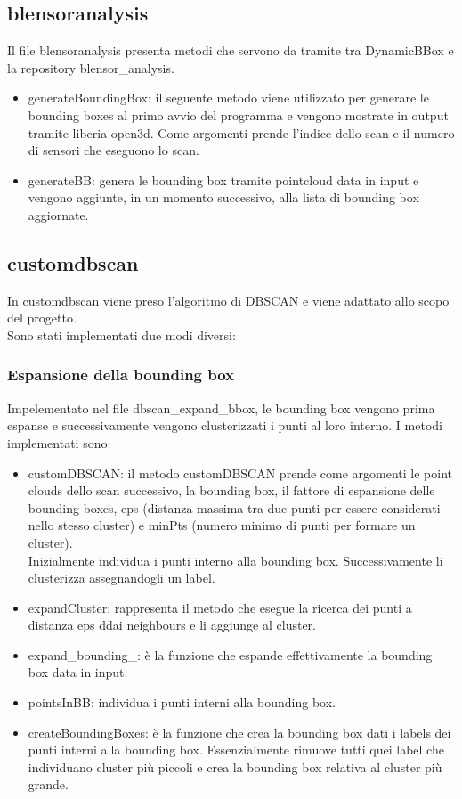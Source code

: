 \documentclass[italian]{article}
\begin{document}
\subsection{blensoranalysis}
Il file blensoranalysis presenta metodi che servono da tramite tra DynamicBBox e la repository blensor\_analysis.
\begin{itemize}
		\item generateBoundingBox: il seguente metodo viene utilizzato per generare le bounding boxes al primo avvio del programma e vengono mostrate in output tramite liberia open3d. Come argomenti prende
			l'indice dello scan e il numero di sensori che eseguono lo scan. 
 		\item generateBB: genera le bounding box tramite pointcloud data in input e vengono aggiunte, in un momento successivo, alla lista di bounding box aggiornate.
\end{itemize}
\subsection{customdbscan}
In customdbscan viene preso l'algoritmo di DBSCAN e viene adattato allo scopo del progetto.\\
Sono stati implementati due modi diversi:
\subsubsection{Espansione della bounding box}
Impelementato nel file dbscan\_expand\_bbox, le bounding box vengono prima espanse e successivamente vengono clusterizzati i punti al loro interno.
I metodi implementati sono:
\begin{itemize}
	\item customDBSCAN: il metodo customDBSCAN prende come argomenti le point clouds dello scan successivo, la bounding box, il fattore di espansione delle bounding boxes, eps (distanza massima tra due punti per essere considerati nello stesso cluster) e minPts (numero minimo di punti per formare un cluster).\\ Inizialmente individua i punti interno alla bounding box. Successivamente li clusterizza assegnandogli un label.
	\item expandCluster: rappresenta il metodo che esegue la ricerca dei punti a distanza eps ddai neighbours e li aggiunge al cluster.
	\item expand\_bounding\_: è la funzione che espande effettivamente la bounding box data in input.
	\item pointsInBB: individua i punti interni alla bounding box.
	\item createBoundingBoxes: è la funzione che crea la bounding box dati i labels dei punti interni alla bounding box. Essenzialmente rimuove tutti quei label che individuano cluster più piccoli e crea la bounding box relativa al cluster più grande.
\end{itemize}
\end{document}
